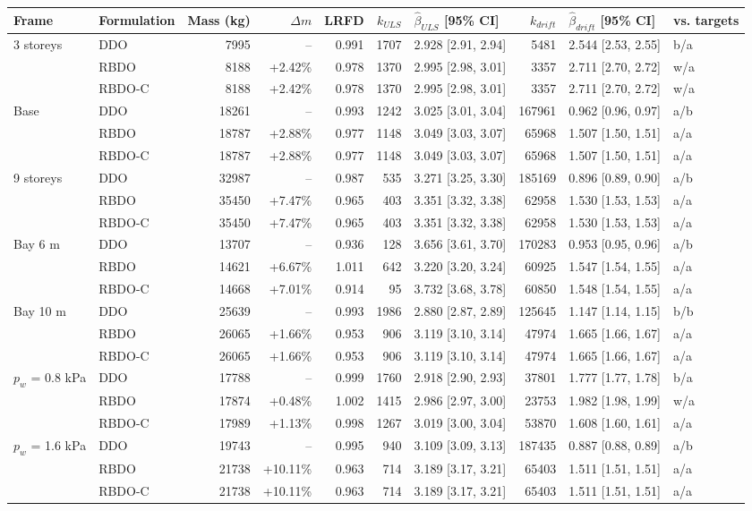 \begin{tabular}{llrrrrlrll}
\toprule
Frame & Formulation & Mass (kg) & $\Delta m$ & LRFD & $k_{ULS}$ & $\hat\beta_{ULS}$ [95\% CI] & $k_{drift}$ & $\hat\beta_{drift}$ [95\% CI] & vs. targets \\
\midrule
3 storeys & DDO & 7995 & -- & 0.991 & 1707 & 2.928 [2.91, 2.94] & 5481 & 2.544 [2.53, 2.55] & b/a \\
 & RBDO & 8188 & +2.42\% & 0.978 & 1370 & 2.995 [2.98, 3.01] & 3357 & 2.711 [2.70, 2.72] & w/a \\
 & RBDO-C & 8188 & +2.42\% & 0.978 & 1370 & 2.995 [2.98, 3.01] & 3357 & 2.711 [2.70, 2.72] & w/a \\
\midrule
Base & DDO & 18261 & -- & 0.993 & 1242 & 3.025 [3.01, 3.04] & 167961 & 0.962 [0.96, 0.97] & a/b \\
 & RBDO & 18787 & +2.88\% & 0.977 & 1148 & 3.049 [3.03, 3.07] & 65968 & 1.507 [1.50, 1.51] & a/a \\
 & RBDO-C & 18787 & +2.88\% & 0.977 & 1148 & 3.049 [3.03, 3.07] & 65968 & 1.507 [1.50, 1.51] & a/a \\
\midrule
9 storeys & DDO & 32987 & -- & 0.987 & 535 & 3.271 [3.25, 3.30] & 185169 & 0.896 [0.89, 0.90] & a/b \\
 & RBDO & 35450 & +7.47\% & 0.965 & 403 & 3.351 [3.32, 3.38] & 62958 & 1.530 [1.53, 1.53] & a/a \\
 & RBDO-C & 35450 & +7.47\% & 0.965 & 403 & 3.351 [3.32, 3.38] & 62958 & 1.530 [1.53, 1.53] & a/a \\
\midrule
Bay 6 m & DDO & 13707 & -- & 0.936 & 128 & 3.656 [3.61, 3.70] & 170283 & 0.953 [0.95, 0.96] & a/b \\
 & RBDO & 14621 & +6.67\% & 1.011 & 642 & 3.220 [3.20, 3.24] & 60925 & 1.547 [1.54, 1.55] & a/a \\
 & RBDO-C & 14668 & +7.01\% & 0.914 & 95 & 3.732 [3.68, 3.78] & 60850 & 1.548 [1.54, 1.55] & a/a \\
\midrule
Bay 10 m & DDO & 25639 & -- & 0.993 & 1986 & 2.880 [2.87, 2.89] & 125645 & 1.147 [1.14, 1.15] & b/b \\
 & RBDO & 26065 & +1.66\% & 0.953 & 906 & 3.119 [3.10, 3.14] & 47974 & 1.665 [1.66, 1.67] & a/a \\
 & RBDO-C & 26065 & +1.66\% & 0.953 & 906 & 3.119 [3.10, 3.14] & 47974 & 1.665 [1.66, 1.67] & a/a \\
\midrule
$p_w$ = 0.8 kPa & DDO & 17788 & -- & 0.999 & 1760 & 2.918 [2.90, 2.93] & 37801 & 1.777 [1.77, 1.78] & b/a \\
 & RBDO & 17874 & +0.48\% & 1.002 & 1415 & 2.986 [2.97, 3.00] & 23753 & 1.982 [1.98, 1.99] & w/a \\
 & RBDO-C & 17989 & +1.13\% & 0.998 & 1267 & 3.019 [3.00, 3.04] & 53870 & 1.608 [1.60, 1.61] & a/a \\
\midrule
$p_w$ = 1.6 kPa & DDO & 19743 & -- & 0.995 & 940 & 3.109 [3.09, 3.13] & 187435 & 0.887 [0.88, 0.89] & a/b \\
 & RBDO & 21738 & +10.11\% & 0.963 & 714 & 3.189 [3.17, 3.21] & 65403 & 1.511 [1.51, 1.51] & a/a \\
 & RBDO-C & 21738 & +10.11\% & 0.963 & 714 & 3.189 [3.17, 3.21] & 65403 & 1.511 [1.51, 1.51] & a/a \\
\bottomrule
\end{tabular}